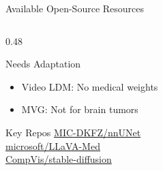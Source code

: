 \documentclass[aspectratio=169,xcolor=dvipsnames]{beamer}
\begin{document}
\begin{frame}{Available Open-Source Resources}
\begin{columns}
        \begin{column}{0.48\textwidth}
            \begin{block}{\textcolor{orange}{} Needs Adaptation}
                \small
                \begin{itemize}\setlength{\itemsep}{1pt}
                    \item Video LDM: No medical weights
                    \item MVG: Not for brain tumors
                \end{itemize}
            \end{block}
            
            
            \begin{exampleblock}{ Key Repos}
                \scriptsize
                \href{https://github.com/MIC-DKFZ/nnUNet}{MIC-DKFZ/nnUNet}\\
                \href{https://github.com/microsoft/LLaVA-Med}{microsoft/LLaVA-Med}\\
                \href{https://github.com/CompVis/stable-diffusion}{CompVis/stable-diffusion}
            \end{exampleblock}
        \end{column}
    \end{columns}
\end{frame}
\end{document}
